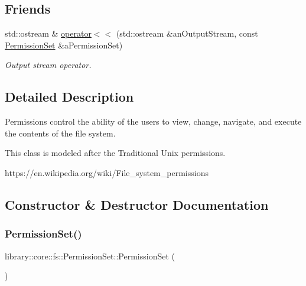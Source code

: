 \subsection*{Friends}
\begin{DoxyCompactItemize}
\item 
std\+::ostream \& \hyperlink{classlibrary_1_1core_1_1fs_1_1PermissionSet_a8f2d68bb94d86dea76869abe148ea9f3}{operator$<$$<$} (std\+::ostream \&an\+Output\+Stream, const \hyperlink{classlibrary_1_1core_1_1fs_1_1PermissionSet}{Permission\+Set} \&a\+Permission\+Set)
\begin{DoxyCompactList}\small\item\em Output stream operator. \end{DoxyCompactList}\end{DoxyCompactItemize}


\subsection{Detailed Description}
Permissions control the ability of the users to view, change, navigate, and execute the contents of the file system. 

This class is modeled after the Traditional Unix permissions.

https\+://en.wikipedia.\+org/wiki/\+File\+\_\+system\+\_\+permissions 

\subsection{Constructor \& Destructor Documentation}
\mbox{\label{classlibrary_1_1core_1_1fs_1_1PermissionSet_a8a6eb39cc2a8bca92a657d065d3e36ba}} 
\subsubsection{\texorpdfstring{Permission\+Set()}{PermissionSet()}\hspace{0.1cm}{\footnotesize\ttfamily [1/2]}}
{\footnotesize\ttfamily library\+::core\+::fs\+::\+Permission\+Set\+::\+Permission\+Set (\begin{DoxyParamCaption}{ }\end{DoxyParamCaption})\hspace{0.3cm}{\ttfamily [delete]}}



